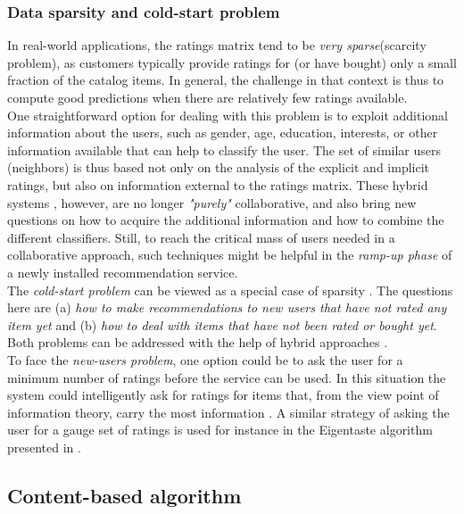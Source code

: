 \subsubsection{Data sparsity and cold-start problem}\label{coldstart}

In real-world applications, the ratings matrix tend to be \textit{very
sparse}(scarcity problem), as customers typically provide  ratings
for (or have bought) only a small fraction of the catalog items. In
general, the challenge in that context is thus to compute good
predictions when there are relatively few ratings available.\\ One
straightforward option for dealing with this problem is to exploit
additional information about the users, such as gender, age,
education, interests, or other information available that can help to
classify the user. The set of similar users (neighbors) is thus based
not only on the analysis of the explicit and implicit ratings, but
also on information external to the ratings matrix. These hybrid
systems  \cite{pazzani2007content}, however, are no longer
\textit{"purely"} collaborative, and also bring new questions on 
how to acquire the additional information and how to combine 
the different classifiers. Still, to reach the critical mass of users needed
in a collaborative approach, such techniques might be helpful in the
\textit{ramp-up phase} of a newly installed recommendation service. \\
The \textit{cold-start problem} can be viewed as a special case of
sparsity  \cite{huang2004applying}. The questions here are (a) \textit{how 
to make recommendations to new users that have not rated
any item yet} and (b) \textit{how to deal with items that have not
been rated or bought yet}. Both problems can be addressed with the
help of hybrid approaches  \cite{adomavicius2005toward}. \\To face the
\textit{new-users problem}, one option could be to ask the user for a
minimum number of ratings before the service can be used. In this
situation the system could intelligently ask for ratings for items
that, from the view point of information theory, carry the most
information  \cite{rashid2002getting}. A similar strategy of asking
the user for a gauge set of ratings is used for instance in the Eigentaste
algorithm presented in  \cite{goldberg2001eigentaste}.

\subsection{Content-based algorithm}

